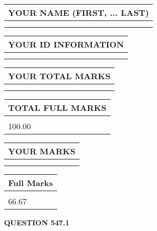 \documentclass{ctexart}
\begin{document}
   
   
   
\newpage 
\setcounter{page}{ 
   547001 } 
   
   
   
   
\noindent\begin{tabular}{|l|}
\hline
YOUR NAME (FIRST, ... LAST)  \\
\hline
 \\ 
 \\ 
\hline
\end{tabular}
\hspace{0.05in} \begin{tabular}{|l|}
\hline
 YOUR   ID   INFORMATION  \\
\hline
 \\ 
 \\ 
\hline
\end{tabular}
   
   
\vspace{0.2in}\noindent\begin{tabular}{|l|}
\hline
YOUR TOTAL MARKS  \\
\hline
 \\ 
 \\ 
\hline
\end{tabular}
\hspace{0.05in} \begin{tabular}{|l|}
\hline
TOTAL FULL MARKS  \\
\hline
 \\ 
100.00 \\
\hline
\end{tabular}
   
   
 \vspace{0.2in}
 
 
 
 
   
   
  
\vspace{0.2in}
  
\noindent\begin{tabular}{|l|}
\hline
 YOUR MARKS  \\
\hline
 \\ 
 \\ 
\hline
\end{tabular}
\hspace{0.05in} \begin{tabular}{|l|}
\hline
 Full Marks  \\
\hline
 \\ 
66.67 \\
\hline
\end{tabular}
{\textbf{\Large{QUESTION
547.1 
}}}
  
\end{document}
